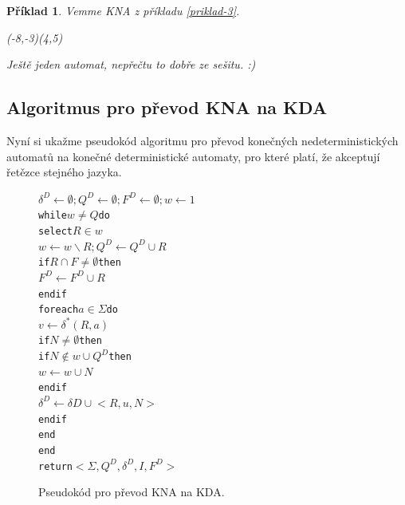 \documentclass[10pt, a4paper, titlepage]{article}
\theoremstyle{note}
\newtheorem{priklad}{Příklad}
\begin{document}
\begin{priklad}
Vemme KNA z příkladu \ref{priklad-3}.

\begin{VCPicture}{(-8,-3)(4,5)}


\end{VCPicture}

Ještě jeden automat, nepřečtu to dobře ze sešitu. :)

\end{priklad}

\subsection{Algoritmus pro převod KNA na KDA}
Nyní si ukažme pseudokód algoritmu pro převod konečných nedeterministických automatů na konečné deterministické automaty, pro které platí, že
akceptují řetězce stejného jazyka.

\vspace{30px}
\begin{figure}[h]
\begin{alltt}
\( \delta^{D} \leftarrow \emptyset; Q^{D} \leftarrow \emptyset; F^{D} \leftarrow \emptyset; w \leftarrow {1} \)
while \( w \neq Q \) do
     select \( R \in w \)
     \( w \leftarrow w \smallsetminus {R}; Q^{D} \leftarrow Q^{D} \cup {R} \)
     if \( R \cap F \neq \emptyset \) then
         \( F^{D} \leftarrow F^{D} \cup {R} \)
     endif
     foreach \( a \in \Sigma \) do
         \( v \leftarrow \delta^{*}(R, a) \)
         if \( N \neq \emptyset \) then
             if \( N \notin w \cup Q^{D} \) then
                 \( w \leftarrow w \cup {N} \)
             endif
             \( \delta^{D} \leftarrow \delta{D} \cup {<R, u, N>} \)
         endif
     end
end
return \( <\Sigma, Q^{D}, \delta^{D}, I, F^{D}> \)
\end{alltt}
\caption{Pseudokód pro převod KNA na KDA.}
\end{figure}
\end{document}
